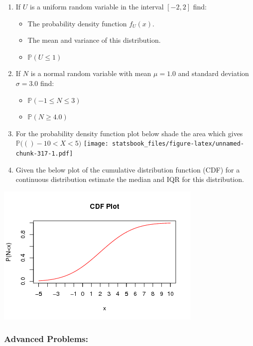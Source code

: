 \documentclass[
]{book}
\providecommand{\tightlist}{%
  \setlength{\itemsep}{0pt}\setlength{\parskip}{0pt}}
\newcommand{\prob}[1]{{\mathbb{P}(#1)}}
\theoremstyle{definition}
\theoremstyle{definition}
\theoremstyle{definition}
\theoremstyle{definition}
\theoremstyle{remark}
\begin{document}
\begin{enumerate}
\def\labelenumi{\arabic{enumi}.}
\item
  If \(U\) is a uniform random variable in the interval \([-2,2]\) find:

  \begin{itemize}
  \tightlist
  \item
    The probability density function \(f_U(x)\).
  \item
    The mean and variance of this distribution.
  \item
    \(\prob{U\leq 1}\)
  \end{itemize}
\item
  If \(N\) is a normal random variable with mean \(\mu=1.0\) and standard deviation \(\sigma=3.0\) find:

  \begin{itemize}
  \tightlist
  \item
    \(\prob{-1 \leq N \leq 3}\)
  \item
    \(\prob{N \geq 4.0}\)
  \end{itemize}
\item
  For the probability density function plot below shade the area which gives \(\prob(-10<X<5)\)
  \texttt{[image: statsbook\_files/figure-latex/unnamed-chunk-317-1.pdf]}
\item
  Given the below plot of the cumulative distribution function (CDF) for a continuous distribution estimate the median and IQR for this distribution.
\end{enumerate}

\includegraphics{CDF_Plot.png}

\hypertarget{advanced-problems-6}{%
\subsubsection{Advanced Problems:}\label{advanced-problems-6}}
\end{document}
